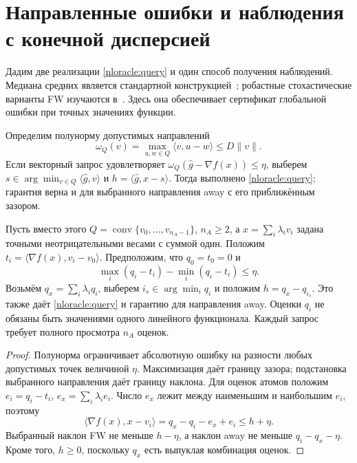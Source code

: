 \section{Направленные ошибки и наблюдения с конечной дисперсией}
\label{diroracle:section}
Дадим две реализации \eqref{nloracle:query} и один способ получения
наблюдений. Медиана средних является стандартной конструкцией~\cite{dirlugosi};
робастные стохастические варианты FW изучаются
в~\cite{dirtang,dirsfyraki}. Здесь она обеспечивает сертификат
глобальной ошибки при точных значениях функции.

\begin{proposition}
\label{diroracle:width-transfer}\label{diroracle:scores}
Определим полунорму допустимых направлений
\[
 \omega_Q(v)=\max_{u,w\in Q}\langle v,u-w\rangle\le D\|v\|.
\]
Если векторный запрос удовлетворяет
$\omega_Q(\widehat g-\nabla f(x))\le\eta$, выберем
$s\in\arg\min_{v\in Q}\langle\widehat g,v\rangle$ и
$h=\langle\widehat g,x-s\rangle$.
Тогда выполнено \eqref{nloracle:query}; гарантия верна и для
выбранного направления away с его приближённым зазором.

Пусть вместо этого $Q=\operatorname{conv}\{v_0,\ldots,v_{n_A-1}\}$,
$n_A\ge2$, а $x=\sum_i\lambda_i v_i$ задана точными неотрицательными
весами с суммой один. Положим
$t_i=\langle\nabla f(x),v_i-v_0\rangle$.
Предположим, что $q_0=t_0=0$ и
\begin{equation}\label{diroracle:score-error}
 \max_i(q_i-t_i)-\min_i(q_i-t_i)\le\eta.
\end{equation}
Возьмём $q_x=\sum_i\lambda_iq_i$, выберем
$i_s\in\arg\min_i q_i$ и положим $h=q_x-q_{i_s}$.
Это также даёт \eqref{nloracle:query} и гарантию для направления away.
Оценки $q_i$ не обязаны быть значениями одного линейного функционала.
Каждый запрос требует полного просмотра $n_A$ оценок.
\end{proposition}
\begin{proof}
Полунорма ограничивает абсолютную ошибку на разности любых
допустимых точек величиной $\eta$.
Максимизация даёт границу зазора; подстановка выбранного направления
даёт границу наклона.
Для оценок атомов положим $e_i=q_i-t_i$,
$e_x=\sum_i\lambda_i e_i$.
Число $e_x$ лежит между наименьшим и наибольшим $e_i$, поэтому
\[
 \langle\nabla f(x),x-v_i\rangle=q_x-q_i-e_x+e_i\le h+\eta.
\]
Выбранный наклон FW не меньше $h-\eta$, а наклон away
не меньше $q_i-q_x-\eta$.
Кроме того, $h\ge0$, поскольку $q_x$ есть выпуклая комбинация оценок.
\end{proof}

